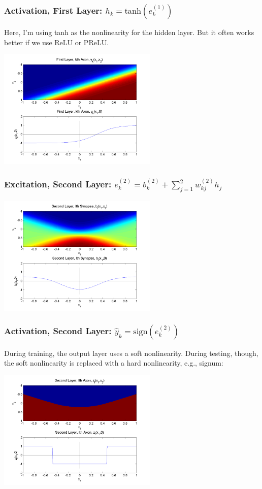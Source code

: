 \documentclass{beamer}
\begin{document}
\begin{frame}
  \frametitle{Activation, First Layer: $h_k=\mbox{tanh}(e_k^{(1)})$}

  Here, I'm using tanh as the nonlinearity for the hidden layer.  But
  it often works better if we use ReLU or PReLU.
  
  \centerline{\includegraphics[width=3in]{figs/nn_axon1.png}}
\end{frame}

\begin{frame}
  \frametitle{Excitation, Second Layer: $e_k^{(2)}=b_{k}^{(2)}+\sum_{j=1}^2w_{kj}^{(2)}h_j$}
  \centerline{\includegraphics[width=3in]{figs/nn_synapse2.png}}
\end{frame}

\begin{frame}
  \frametitle{Activation, Second Layer: $\hat{y}_k=\mbox{sign}(e_k^{(2)})$}

  During  training, the output layer uses  a soft nonlinearity.  During testing, though, the
  soft nonlinearity is replaced with a hard nonlinearity, e.g., signum:
  \centerline{\includegraphics[width=3in]{figs/nn_axon2.png}}
\end{frame}
\end{document}
